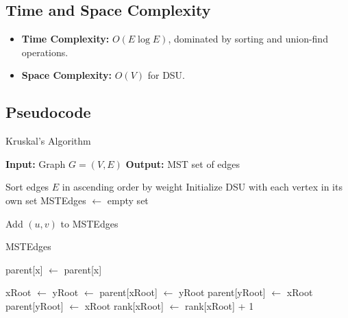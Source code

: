 \documentclass[a4paper,14pt]{extarticle}
\begin{document}
\subsection*{Time and Space Complexity}
\begin{itemize}
    \item \textbf{Time Complexity:} \(O(E \log E)\), dominated by sorting and union-find operations.
    \item \textbf{Space Complexity:} \(O(V)\) for DSU.
\end{itemize}

\subsection{Pseudocode}

\begin{algorithm}[H]
\caption{Kruskal's Algorithm}
\begin{algorithmic}[1]
\State \textbf{Input:} Graph \(G = (V, E)\)
\State \textbf{Output:} MST set of edges

    \State Sort edges \(E\) in ascending order by weight
    \State Initialize DSU with each vertex in its own set
    \State MSTEdges \(\gets\) empty set

            \State Add \((u, v)\) to MSTEdges
            \State {}
        \EndIf
    \EndFor

    \State \Return MSTEdges
\EndFunction

        \State parent[x] \(\gets\)  
    \EndIf
    \State \Return parent[x]
\EndFunction

    \State xRoot \(\gets\) 
    \State yRoot \(\gets\) 
        \State parent[xRoot] \(\gets\) yRoot
        \State parent[yRoot] \(\gets\) xRoot
    \Else
        \State parent[yRoot] \(\gets\) xRoot
        \State rank[xRoot] \(\gets\) rank[xRoot] + 1
    \EndIf
\EndFunction
\end{algorithmic}
\end{algorithm}


\newpage
\end{document}
